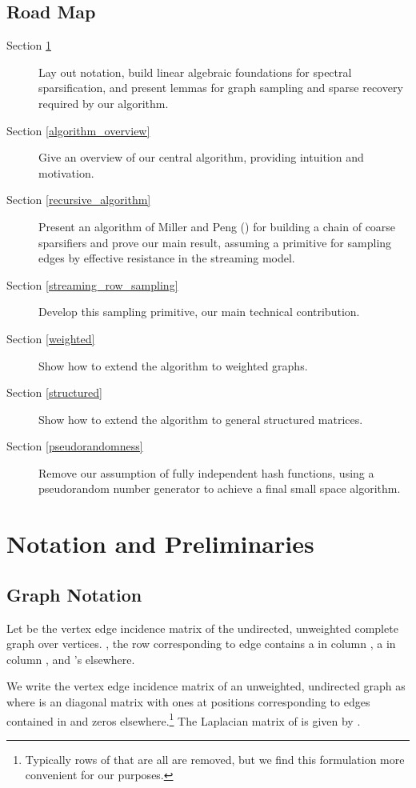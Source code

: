 \documentclass[11pt]{article}
\begin{document}
\subsection{Road Map}
\begin{description}
\item[Section \ref{notation}] Lay out notation, build linear algebraic foundations for spectral sparsification, and present  lemmas for graph sampling and sparse recovery required by our algorithm.
\item[Section \ref{algorithm_overview}] Give an overview of our central algorithm, providing intuition and motivation.
\item[Section \ref{recursive_algorithm}] Present an algorithm of Miller and Peng (\cite{pengV1}) for building a chain of coarse sparsifiers and prove our main result, assuming a primitive for sampling edges by effective resistance in the streaming model.
\item[Section \ref{streaming_row_sampling}] Develop this sampling primitive, our main technical contribution.
\item[Section \ref{weighted}] Show how to extend the algorithm to weighted graphs.
\item[Section \ref{structured}] Show how to extend the algorithm to general structured matrices.
\item[Section \ref{pseudorandomness}] Remove our assumption of fully independent hash functions, using a pseudorandom number generator to achieve a final small space algorithm.
\end{description}
 \section{Notation and Preliminaries}\label{notation}

\subsection{Graph Notation}
Let  be the vertex edge incidence matrix of the undirected, unweighted complete graph over  vertices. , the row corresponding to edge  contains a  in column , a  in column , and 's elsewhere. 

We write the vertex edge incidence matrix of an unweighted, undirected graph  as  where  is an  diagonal matrix with ones at positions corresponding to edges contained in  and zeros elsewhere.\footnote{Typically rows of  that are all  are removed, but we find this formulation more convenient for our purposes.}
The  Laplacian matrix of  is given by  . 
\end{document}
